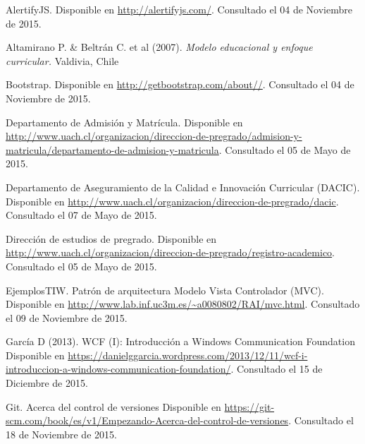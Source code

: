 \begin{spacing}{1.0}
\begin{thebibliography}{99}  

\newblock AlertifyJS.
\newblock Disponible en \url{http://alertifyjs.com/}.
\newblock Consultado el 04 de Noviembre de 2015.


\newblock Altamirano P. \& Beltrán C. et al (2007).
\newblock \textit{Modelo educacional y enfoque curricular.}
\newblock Valdivia, Chile 

\newblock Bootstrap.
\newblock Disponible en \url{http://getbootstrap.com/about//}.
\newblock Consultado el 04 de Noviembre de 2015.

\newblock Departamento de Admisión y Matrícula.
\newblock Disponible en \url{http://www.uach.cl/organizacion/direccion-de-pregrado/admision-y-matricula/departamento-de-admision-y-matricula}.
\newblock Consultado el 05 de Mayo de 2015.


\newblock Departamento de Aseguramiento de la Calidad e Innovación Curricular (DACIC).
\newblock Disponible en \url{http://www.uach.cl/organizacion/direccion-de-pregrado/dacic}.
\newblock Consultado el 07 de Mayo de 2015.

\newblock Dirección de estudios de pregrado.
\newblock Disponible en \url{http://www.uach.cl/organizacion/direccion-de-pregrado/registro-academico}.
\newblock Consultado el 05 de Mayo de 2015.


\newblock EjemplosTIW.
\newblock Patrón de arquitectura Modelo Vista Controlador (MVC).
\newblock Disponible en \url{http://www.lab.inf.uc3m.es/~a0080802/RAI/mvc.html}.
\newblock Consultado el 09 de Noviembre de 2015.


\newblock García D (2013).
\newblock WCF (I): Introducción a Windows Communication Foundation
\newblock Disponible en \url{https://danielggarcia.wordpress.com/2013/12/11/wcf-i-introduccion-a-windows-communication-foundation/}.
\newblock Consultado el 15 de Diciembre de 2015.


\newblock Git.	Acerca del control de versiones 
\newblock Disponible en \url{https://git-scm.com/book/es/v1/Empezando-Acerca-del-control-de-versiones}.
\newblock Consultado el 18 de Noviembre de 2015.



\end{thebibliography}
\end{spacing}
